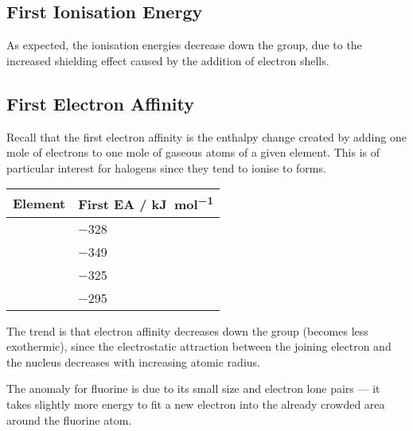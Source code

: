 


		\subsection{First Ionisation Energy}

			As expected, the ionisation energies decrease down the group, due to the increased shielding effect caused by the addition
			of electron shells.


		\pagebreak

		\subsection{First Electron Affinity}

			Recall that the first electron affinity is the enthalpy change created by adding one mole of electrons to one mole of gaseous atoms of a
			given element. This is of particular interest for halogens since they tend to ionise to  forms.

			\begin{table}[htb]\renewcommand{\arraystretch}{1.5}\begin{center}
			\begin{tabu} to 0.6\textwidth {X[c,m] | X[c,m]}

				Element     &   First EA / \si{\kilo\joule\per\mole}    \\  \hline
				      &   \num{-328}                              \\
				\ch{\Cl}    &   \num{-349}                              \\
				     &   \num{-325}                              \\
				      &   \num{-295}                              \\

			\end{tabu}\end{center}
			\end{table}\vspace{-1em}

			The trend is that electron affinity decreases down the group (becomes less exothermic), since the electrostatic
			attraction between the joining electron and the nucleus decreases with increasing atomic radius.

			The anomaly for fluorine is due to its small size and electron lone pairs --- it takes slightly more energy to fit
			a new electron into the already crowded area around the fluorine atom.

